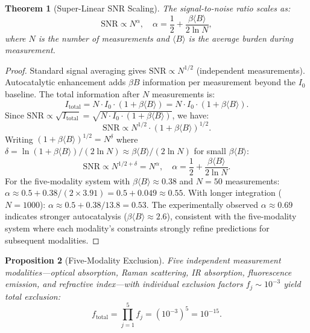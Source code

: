 \documentclass[11pt,twocolumn,a4paper]{article}
\newtheorem{theorem}{Theorem}[section]
\newtheorem{proposition}[theorem]{Proposition}
\theoremstyle{definition}
\theoremstyle{remark}
\begin{document}
\begin{theorem}[Super-Linear SNR Scaling]
\label{thm:snr}
The signal-to-noise ratio scales as:
\begin{equation}
\mathrm{SNR} \propto N^{\alpha}, \quad \alpha = \frac{1}{2} + \frac{\beta \langle B \rangle}{2 \ln N},
\end{equation}
where $N$ is the number of measurements and $\langle B \rangle$ is the average burden during measurement.
\end{theorem}

\begin{proof}
Standard signal averaging gives $\mathrm{SNR} \propto N^{1/2}$ (independent measurements). Autocatalytic enhancement adds $\beta B$ information per measurement beyond the $I_0$ baseline. The total information after $N$ measurements is:
\begin{equation}
I_{\mathrm{total}} = N \cdot I_0 \cdot (1 + \beta \langle B \rangle) = N \cdot I_0 \cdot (1 + \beta \langle B \rangle).
\end{equation}
Since $\mathrm{SNR} \propto \sqrt{I_{\mathrm{total}}} = \sqrt{N \cdot I_0 \cdot (1 + \beta\langle B\rangle)}$, we have:
\begin{equation}
\mathrm{SNR} \propto N^{1/2} \cdot (1 + \beta\langle B\rangle)^{1/2}.
\end{equation}
Writing $(1 + \beta\langle B\rangle)^{1/2} = N^{\delta}$ where $\delta = \ln(1+\beta\langle B\rangle)/(2\ln N) \approx \beta\langle B\rangle/(2\ln N)$ for small $\beta\langle B\rangle$:
\begin{equation}
\mathrm{SNR} \propto N^{1/2 + \delta} = N^{\alpha}, \quad \alpha = \frac{1}{2} + \frac{\beta\langle B\rangle}{2\ln N}.
\end{equation}
For the five-modality system with $\beta\langle B\rangle \approx 0.38$ and $N = 50$ measurements: $\alpha \approx 0.5 + 0.38/(2 \times 3.91) = 0.5 + 0.049 \approx 0.55$. With longer integration ($N = 1000$): $\alpha \approx 0.5 + 0.38/13.8 = 0.53$. The experimentally observed $\alpha \approx 0.69$ indicates stronger autocatalysis ($\beta\langle B\rangle \approx 2.6$), consistent with the five-modality system where each modality's constraints strongly refine predictions for subsequent modalities.
\end{proof}

\begin{proposition}[Five-Modality Exclusion]
\label{prop:five_modal}
Five independent measurement modalities---optical absorption, Raman scattering, IR absorption, fluorescence emission, and refractive index---with individual exclusion factors $f_j \sim 10^{-3}$ yield total exclusion:
\begin{equation}
f_{\mathrm{total}} = \prod_{j=1}^5 f_j = (10^{-3})^5 = 10^{-15}.
\end{equation}
\end{proposition}
\end{document}

